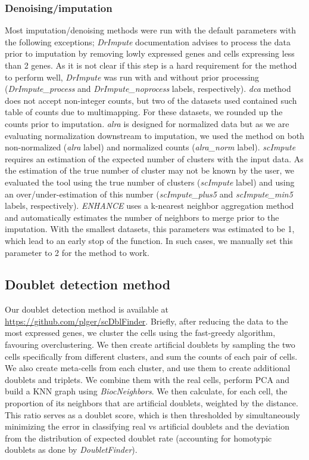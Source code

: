 \documentclass{bmcart}
\begin{document}
\subsubsection*{Denoising/imputation}
Most imputation/denoising methods were run with the default parameters with the following exceptions; \textit{DrImpute} documentation advises to process the data prior to imputation by removing lowly expressed genes and cells expressing less than 2 genes. As it is not clear if this step is a hard requirement for the method to perform well, \textit{DrImpute} was run with and without prior processing (\textit{DrImpute\_process} and \textit{DrImpute\_noprocess} labels, respectively). \textit{dca} method does not accept non-integer counts, but two of the datasets used contained such table of counts due to multimapping. For these datasets, we rounded up the counts prior to imputation. \textit{alra} is designed for normalized data but as we are evaluating normalization downstream to imputation, we used the method on both non-normalized (\textit{alra} label) and normalized counts (\textit{alra\_norm} label). \textit{scImpute} requires an estimation of the expected number of clusters with the input data. As the estimation of the true number of cluster may not be known by the user, we evaluated the tool using the true number of clusters (\textit{scImpute} label) and using an over/under-estimation of this number (\textit{scImpute\_plus5} and \textit{scImpute\_min5} labels, respectively). \textit{ENHANCE} uses a k-nearest neighbor aggregation method and automatically estimates the number of neighbors to merge prior to the imputation. With the smallest datasets, this parameters was estimated to be 1, which lead to an early stop of the function. In such cases, we manually set this parameter to 2 for the method to work. 

\subsection*{Doublet detection method}
Our doublet detection method is available at \url{https://github.com/plger/scDblFinder}. Briefly, after reducing the data to the most expressed genes, we cluster the cells using the fast-greedy algorithm, favouring overclustering. We then create artificial doublets by sampling the two cells specifically from different clusters, and sum the counts of each pair of cells. We also create meta-cells from each cluster, and use them to create additional doublets and triplets. We combine them with the real cells, perform PCA and build a KNN graph using \textit{BiocNeighbors}. We then calculate, for each cell, the proportion of its neighbors that are artificial doublets, weighted by the distance. This ratio serves as a doublet score, which is then thresholded by simultaneously minimizing the error in classifying real vs artificial doublets and the deviation from the distribution of expected doublet rate (accounting for homotypic doublets as done by \textit{DoubletFinder}).
\end{document}
